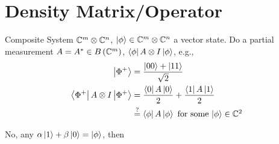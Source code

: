 \section{Density Matrix/Operator}

Composite System $\mathbb{C}^m \otimes \mathbb{C}^n$, $\left|\phi\right\rangle \in \mathbb{C}^m \otimes \mathbb{C}^n$
a vector state. Do a partial measurement $A = A^*\in B\left(\mathbb{C}^m\right)$,
$\left\langle \phi\right|A\otimes I\left|\phi\right\rangle$, e.g.,
\begin{align*}
    \left|\Phi^+\right\rangle                           & = \frac{\left|00\right\rangle + \left|11\right\rangle}{\sqrt{2}}                                               \\
    \left\langle \Phi^+\right|A\otimes I\left|\Phi^+\right\rangle & = \frac{\left\langle 0\right|A\left|0\right\rangle}{2} + \frac{\left\langle 1\right|A\left|1\right\rangle}{2}                              \\
                                           & \overset{?}{=} \left\langle \phi\right|A\left|\phi\right\rangle\hbox{ for some $\left|\phi\right\rangle \in \mathbb{C}^2$}
\end{align*}

No, any $\alpha\left|1\right\rangle + \beta\left|0\right\rangle = \left|\phi\right\rangle$, then
